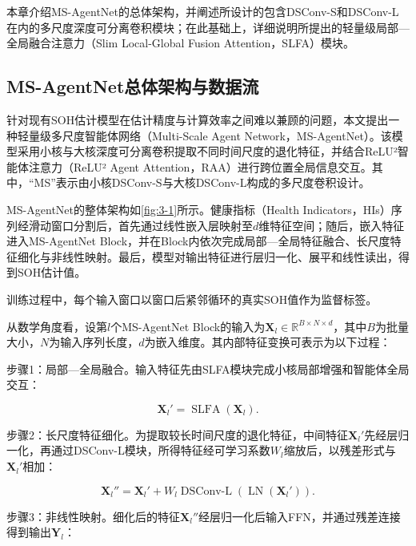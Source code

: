 本章介绍MS-AgentNet的总体架构，并阐述所设计的包含DSConv-S和DSConv-L在内的多尺度深度可分离卷积模块；在此基础上，详细说明所提出的轻量级局部—全局融合注意力（Slim Local-Global Fusion Attention，SLFA）模块。

\subsection{MS-AgentNet总体架构与数据流}

针对现有SOH估计模型在估计精度与计算效率之间难以兼顾的问题，本文提出一种轻量级多尺度智能体网络（Multi-Scale Agent Network，MS-AgentNet）。该模型采用小核与大核深度可分离卷积提取不同时间尺度的退化特征，并结合ReLU²智能体注意力（ReLU² Agent Attention，RAA）进行跨位置全局信息交互。其中，“MS”表示由小核DSConv-S与大核DSConv-L构成的多尺度卷积设计。

MS-AgentNet的整体架构如\cref{fig:3-1}所示。健康指标（Health Indicators，HIs）序列经滑动窗口分割后，首先通过线性嵌入层映射至$d$维特征空间；随后，嵌入特征进入MS-AgentNet Block，并在Block内依次完成局部—全局特征融合、长尺度特征细化与非线性映射。最后，模型对输出特征进行层归一化、展平和线性读出，得到SOH估计值。



训练过程中，每个输入窗口以窗口后紧邻循环的真实SOH值作为监督标签。

从数学角度看，设第$l$个MS-AgentNet Block的输入为$\mathbf X_l\in\mathbb R^{B\times N\times d}$，其中$B$为批量大小，$N$为输入序列长度，$d$为嵌入维度。其内部特征变换可表示为以下过程：

步骤1：局部—全局融合。输入特征先由SLFA模块完成小核局部增强和智能体全局交互：

\begin{equation}
\mathbf X_l'
=
\operatorname{SLFA}(\mathbf X_l).
\label{eq:block_slfa}
\end{equation}

步骤2：长尺度特征细化。为提取较长时间尺度的退化特征，中间特征$\mathbf X_l'$先经层归一化，再通过DSConv-L模块，所得特征经可学习系数$W_l$缩放后，以残差形式与$\mathbf X_l'$相加：

\begin{equation}
\mathbf X_l''
=
\mathbf X_l'
+
W_l
\operatorname{DSConv\text{-}L}
\left(
\operatorname{LN}(\mathbf X_l')
\right).
\label{eq:block_dsconv_l}
\end{equation}

步骤3：非线性映射。细化后的特征$\mathbf X_l''$经层归一化后输入FFN，并通过残差连接得到输出$\mathbf Y_l$：

